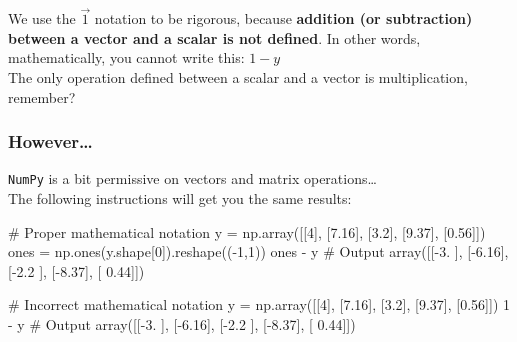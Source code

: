 \documentclass[]{article}
\newenvironment{Shaded}{\begin{snugshade}}{\end{snugshade}}
\newcommand{\CommentTok}[1]{\textcolor[rgb]{0.48,0.49,0.49}{#1}}
\newcommand{\DecValTok}[1]{\textcolor[rgb]{0.96,0.45,0.00}{#1}}
\newcommand{\FloatTok}[1]{\textcolor[rgb]{0.96,0.45,0.00}{#1}}
\newcommand{\NormalTok}[1]{\textcolor[rgb]{0.81,0.81,0.76}{#1}}
\newcommand{\OperatorTok}[1]{\textcolor[rgb]{0.81,0.81,0.76}{#1}}
\begin{document}
We use the \(\vec{1}\) notation to be rigorous, because \textbf{addition
(or subtraction) between a vector and a scalar is not defined}. In other
words, mathematically, you cannot write this: \(1 - y\)\\
The only operation defined between a scalar and a vector is
multiplication, remember?

\hypertarget{however}{%
\subsubsection{However\ldots{}}\label{however}}

\texttt{NumPy} is a bit permissive on vectors and matrix
operations\ldots{}\\
The following instructions will get you the same results:

\begin{Shaded}
\begin{Highlighting}[]
\CommentTok{# Proper mathematical notation}
\NormalTok{y }\OperatorTok{=}\NormalTok{ np.array([[}\DecValTok{4}\NormalTok{], [}\FloatTok{7.16}\NormalTok{], [}\FloatTok{3.2}\NormalTok{], [}\FloatTok{9.37}\NormalTok{], [}\FloatTok{0.56}\NormalTok{]])}
\NormalTok{ones }\OperatorTok{=}\NormalTok{ np.ones(y.shape[}\DecValTok{0}\NormalTok{]).reshape((}\OperatorTok{-}\DecValTok{1}\NormalTok{,}\DecValTok{1}\NormalTok{))}
\NormalTok{ones }\OperatorTok{-}\NormalTok{ y}
\CommentTok{# Output}
\NormalTok{array([[}\OperatorTok{-}\FloatTok{3.}\NormalTok{  ],}
\NormalTok{       [}\OperatorTok{-}\FloatTok{6.16}\NormalTok{],}
\NormalTok{       [}\OperatorTok{-}\FloatTok{2.2}\NormalTok{ ],}
\NormalTok{       [}\OperatorTok{-}\FloatTok{8.37}\NormalTok{],}
\NormalTok{       [ }\FloatTok{0.44}\NormalTok{]])}

\CommentTok{# Incorrect mathematical notation}
\NormalTok{y }\OperatorTok{=}\NormalTok{ np.array([[}\DecValTok{4}\NormalTok{], [}\FloatTok{7.16}\NormalTok{], [}\FloatTok{3.2}\NormalTok{], [}\FloatTok{9.37}\NormalTok{], [}\FloatTok{0.56}\NormalTok{]])}
\DecValTok{1} \OperatorTok{-}\NormalTok{ y}
\CommentTok{# Output}
\NormalTok{array([[}\OperatorTok{-}\FloatTok{3.}\NormalTok{  ],}
\NormalTok{       [}\OperatorTok{-}\FloatTok{6.16}\NormalTok{],}
\NormalTok{       [}\OperatorTok{-}\FloatTok{2.2}\NormalTok{ ],}
\NormalTok{       [}\OperatorTok{-}\FloatTok{8.37}\NormalTok{],}
\NormalTok{       [ }\FloatTok{0.44}\NormalTok{]])}
\end{Highlighting}
\end{Shaded}
\end{document}
